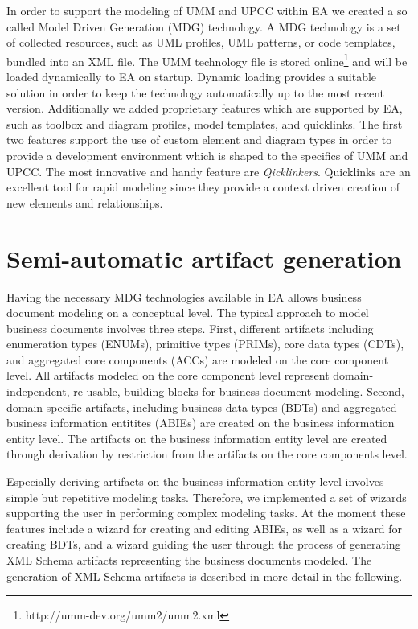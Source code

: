 \documentclass{acm_proc_article-sp}
\begin{document}
In order to support the modeling of UMM and UPCC within EA we created a so called Model Driven Generation (MDG) technology. A MDG technology is a set of collected resources, such as UML profiles, UML patterns, or code templates, bundled into an XML file. The UMM technology file is stored online\footnote{http://umm-dev.org/umm2/umm2.xml} and will be loaded dynamically to EA on startup. Dynamic loading provides a suitable solution in order to keep the technology automatically up to the most recent version. Additionally we added proprietary features which are supported by EA, such as toolbox and diagram profiles, model templates, and quicklinks. The first two features support the use of custom element and diagram types in order to provide a development environment which is shaped to the specifics of UMM and UPCC. The most innovative and handy feature are \textit{Qicklinkers}. Quicklinks are an excellent tool for rapid modeling since they provide a context driven creation of new elements and relationships. 

\section{Semi-automatic artifact generation}

Having the necessary MDG technologies available in EA allows business document modeling on a conceptual level. The typical approach to model business documents involves three steps. First, different artifacts including enumeration types (ENUMs), primitive types (PRIMs), core data types (CDTs), and aggregated core components (ACCs) are modeled on the core component level. All artifacts modeled on the core component level represent domain-independent, re-usable, building blocks for business document modeling. Second, domain-specific artifacts, including business data types (BDTs) and aggregated business information entitites (ABIEs) are created on the business information entity level. The artifacts on the business information entity level are created through derivation by restriction from the artifacts on the core components level. 

Especially deriving artifacts on the business information entity level involves simple but repetitive modeling tasks. Therefore, we implemented a set of wizards supporting the user in performing complex modeling tasks. At the moment these features include a wizard for creating and editing ABIEs, as well as a wizard for creating BDTs, and a wizard guiding the user through the process of generating XML Schema artifacts representing the business documents modeled. The generation of XML Schema artifacts is described in more detail in the following. 
\end{document}
